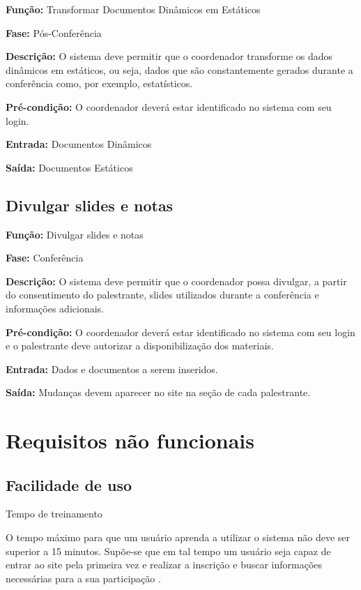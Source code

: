 \documentclass[letter]{article}
\begin{document}
\textbf{Função:} Transformar Documentos Dinâmicos em Estáticos

\textbf{Fase:}  Pós-Conferência

\textbf{Descrição:}  O sistema deve permitir que o coordenador transforme os dados dinâmicos em estáticos, ou seja, dados que são constantemente gerados durante a conferência como, por exemplo, estatísticos.

\textbf{Pré-condição:}  O coordenador deverá estar identificado no sistema com seu login.

\textbf{Entrada:}  Documentos Dinâmicos

\textbf{Saída:}  Documentos Estáticos


\subsection{Divulgar slides e notas}

\textbf{Função:} Divulgar slides e notas

\textbf{Fase:}  Conferência

\textbf{Descrição:}  O sistema deve permitir que o coordenador possa divulgar, a partir do consentimento do palestrante, slides utilizados durante a conferência e informações adicionais.

\textbf{Pré-condição:}  O coordenador deverá estar identificado no sistema com seu login e o palestrante deve autorizar a disponibilização dos materiais.

\textbf{Entrada:}  Dados e documentos a serem inseridos.

\textbf{Saída:}  Mudanças devem aparecer no site na seção de cada palestrante.

 





\section{Requisitos não funcionais}

\subsection{ Facilidade de uso}
\textbullet Tempo de treinamento

O tempo máximo para que um usuário aprenda a utilizar o sistema não deve ser superior a 15 minutos.
Supõe-se que em tal tempo um usuário seja capaz de entrar ao site 
pela primeira vez e realizar a inscrição e buscar informações necessárias para a sua participação .
\end{document}

